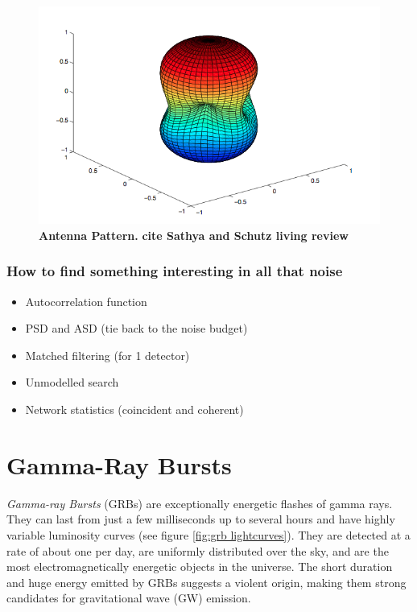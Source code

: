 \documentclass[11pt]{cuthesis}
\begin{document}
\begin{figure} %
\begin{center}
\includegraphics[width=0.8\linewidth]{antenna_pattern.png}
\end{center}
\caption{\textbf{Antenna Pattern.} \textbf{cite Sathya and Schutz living review} }
\label{fig:antenna pattern}
\end{figure}

\subsection{How to find something interesting in all that noise}
\begin{itemize}
\item Autocorrelation function
\item PSD and ASD (tie back to the noise budget) 
\item Matched filtering (for 1 detector)
\item Unmodelled search
\item Network statistics (coincident and coherent) 
\end{itemize}

\chapter{Gamma-Ray Bursts} \label{chap:GRBs}
\textit{Gamma-ray Bursts} (GRBs) are exceptionally energetic flashes of gamma rays. They can last from just a few milliseconds up to several hours and have highly variable luminosity curves (see figure \ref{fig:grb lightcurves}). They are detected at a rate of about one per day, are uniformly distributed over the sky, and are the most electromagnetically energetic objects in the universe. The short duration and huge energy emitted by GRBs suggests a violent origin, making them strong candidates for gravitational wave (GW) emission.
\end{document}
